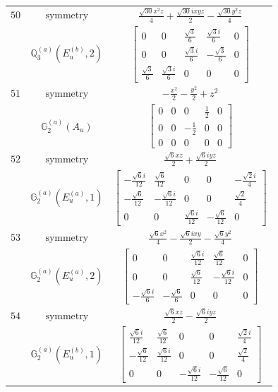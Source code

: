 \documentclass[fleqn,8pt,landscape]{jsarticle}
\begin{document}
\begin{longtable}{ccc}
$ 50 $ & $ \text{symmetry} $ & $ \frac{\sqrt{30} x^{2} z}{4} + \frac{\sqrt{30} i x y z}{2} - \frac{\sqrt{30} y^{2} z}{4} $ \\
$  $ & $ \mathbb{Q}_{3}^{(a)}(E_{u}^{(b)},2) $ & $ \begin{bmatrix} 0 & 0 & \frac{\sqrt{3}}{6} & \frac{\sqrt{3} i}{6} & 0 \\ 0 & 0 & \frac{\sqrt{3} i}{6} & - \frac{\sqrt{3}}{6} & 0 \\ \frac{\sqrt{3}}{6} & \frac{\sqrt{3} i}{6} & 0 & 0 & 0 \end{bmatrix} $ \\ \hline
$ 51 $ & $ \text{symmetry} $ & $ - \frac{x^{2}}{2} - \frac{y^{2}}{2} + z^{2} $ \\
$  $ & $ \mathbb{G}_{2}^{(a)}(A_{u}) $ & $ \begin{bmatrix} 0 & 0 & 0 & \frac{1}{2} & 0 \\ 0 & 0 & - \frac{1}{2} & 0 & 0 \\ 0 & 0 & 0 & 0 & 0 \end{bmatrix} $ \\ \hline
$ 52 $ & $ \text{symmetry} $ & $ \frac{\sqrt{6} x z}{2} + \frac{\sqrt{6} i y z}{2} $ \\
$  $ & $ \mathbb{G}_{2}^{(a)}(E_{u}^{(a)},1) $ & $ \begin{bmatrix} - \frac{\sqrt{6} i}{12} & \frac{\sqrt{6}}{12} & 0 & 0 & - \frac{\sqrt{2} i}{4} \\ - \frac{\sqrt{6}}{12} & - \frac{\sqrt{6} i}{12} & 0 & 0 & \frac{\sqrt{2}}{4} \\ 0 & 0 & \frac{\sqrt{6} i}{12} & - \frac{\sqrt{6}}{12} & 0 \end{bmatrix} $ \\ \hline
$ 53 $ & $ \text{symmetry} $ & $ \frac{\sqrt{6} x^{2}}{4} - \frac{\sqrt{6} i x y}{2} - \frac{\sqrt{6} y^{2}}{4} $ \\
$  $ & $ \mathbb{G}_{2}^{(a)}(E_{u}^{(a)},2) $ & $ \begin{bmatrix} 0 & 0 & \frac{\sqrt{6} i}{12} & \frac{\sqrt{6}}{12} & 0 \\ 0 & 0 & \frac{\sqrt{6}}{12} & - \frac{\sqrt{6} i}{12} & 0 \\ - \frac{\sqrt{6} i}{6} & - \frac{\sqrt{6}}{6} & 0 & 0 & 0 \end{bmatrix} $ \\ \hline
$ 54 $ & $ \text{symmetry} $ & $ \frac{\sqrt{6} x z}{2} - \frac{\sqrt{6} i y z}{2} $ \\
$  $ & $ \mathbb{G}_{2}^{(a)}(E_{u}^{(b)},1) $ & $ \begin{bmatrix} \frac{\sqrt{6} i}{12} & \frac{\sqrt{6}}{12} & 0 & 0 & \frac{\sqrt{2} i}{4} \\ - \frac{\sqrt{6}}{12} & \frac{\sqrt{6} i}{12} & 0 & 0 & \frac{\sqrt{2}}{4} \\ 0 & 0 & - \frac{\sqrt{6} i}{12} & - \frac{\sqrt{6}}{12} & 0 \end{bmatrix} $ \\ \hline

\end{longtable}
\end{document}
